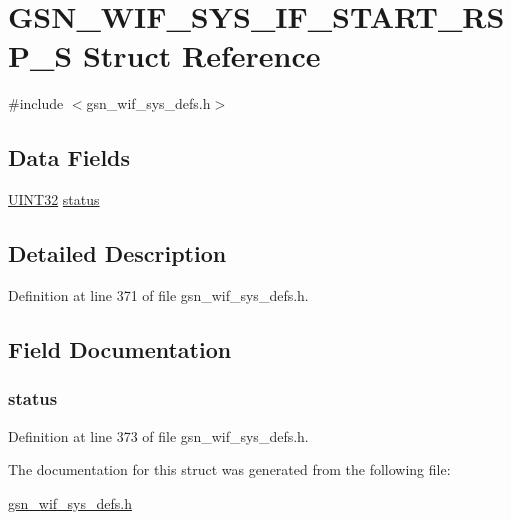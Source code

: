 \hypertarget{a00354}{
\section{GSN\_\-WIF\_\-SYS\_\-IF\_\-START\_\-RSP\_\-S Struct Reference}
\label{a00354}
}


{\ttfamily \#include $<$gsn\_\-wif\_\-sys\_\-defs.h$>$}

\subsection*{Data Fields}
\begin{DoxyCompactItemize}
\item 
\hyperlink{a00660_gae1e6edbbc26d6fbc71a90190d0266018}{UINT32} \hyperlink{a00354_ac6b7193d1fe7063cf448ef96398230d8}{status}
\end{DoxyCompactItemize}


\subsection{Detailed Description}


Definition at line 371 of file gsn\_\-wif\_\-sys\_\-defs.h.



\subsection{Field Documentation}
\hypertarget{a00354_ac6b7193d1fe7063cf448ef96398230d8}{
\subsubsection[{status}]{ {\bf status}}}
\label{a00354_ac6b7193d1fe7063cf448ef96398230d8}


Definition at line 373 of file gsn\_\-wif\_\-sys\_\-defs.h.



The documentation for this struct was generated from the following file:\begin{DoxyCompactItemize}
\item 
\hyperlink{a00612}{gsn\_\-wif\_\-sys\_\-defs.h}\end{DoxyCompactItemize}

